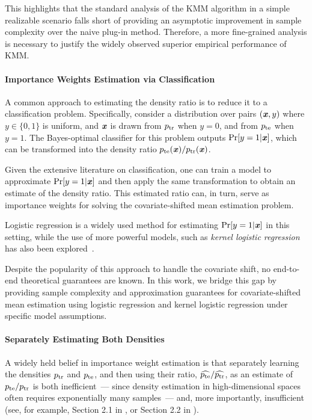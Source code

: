 This highlights that the standard analysis of the KMM algorithm in a simple realizable scenario falls short of providing an asymptotic improvement in sample complexity over the naive plug-in method. Therefore, a more fine-grained analysis is necessary to justify the widely observed superior empirical performance of KMM.

\paragraph{Importance Weights Estimation via Classification}

A common approach to estimating the density ratio is to reduce it to a classification problem. Specifically, consider a distribution over pairs $(\boldsymbol{\mathit{x}}, y)$ where $y \in \{ 0, 1\}$ is uniform, 
and $\boldsymbol{\mathit{x}}$ is drawn from $p_{\mathrm{tr}}$ when $y=0$, and from $p_{\mathrm{te}}$ when $y=1$. The Bayes-optimal classifier for this problem outputs $\Pr[y=1 | \boldsymbol{\mathit{x}}]$, which can be transformed into the density ratio $p_{\mathrm{te}}(\boldsymbol{\mathit{x}})/p_{\mathrm{tr}}(\boldsymbol{\mathit{x}})$.

Given the extensive literature on classification, one can train a model to approximate $\Pr[y=1 | \boldsymbol{\mathit{x}}]$ and then apply the same transformation to obtain an estimate of the density ratio. This estimated ratio can, in turn, serve as importance weights for solving the covariate-shifted mean estimation problem.

Logistic regression is a widely used method for estimating $\Pr[y=1 | \boldsymbol{\mathit{x}}]$ in this setting, while the use of more powerful models, such as \emph{kernel logistic regression} has also been explored~\cite{bickel2009discriminative,sugiyama2012density}.  

Despite the popularity of this approach to handle the covariate shift, no end-to-end theoretical guarantees are known. In this work, we bridge this gap by providing sample complexity and approximation guarantees for covariate-shifted mean estimation using logistic regression and kernel logistic regression under specific model assumptions.

\paragraph{Separately Estimating Both Densities}

A widely held belief in importance weight estimation is that separately learning the densities $p_{\mathrm{tr}}$ and $p_{\mathrm{te}}$, and then using their ratio, $\widehat{p_{\mathrm{te}}}/\widehat{p_{\mathrm{tr}}}$, as an estimate of $p_{\mathrm{te}}/p_{\mathrm{tr}}$ is both inefficient~--- since density estimation in high-dimensional spaces often requires exponentially many samples~--- and, more importantly, insufficient (see, for example, Section 2.1 in \cite{huang2006correcting}, or Section 2.2 in \cite{yu2012analysis}).

